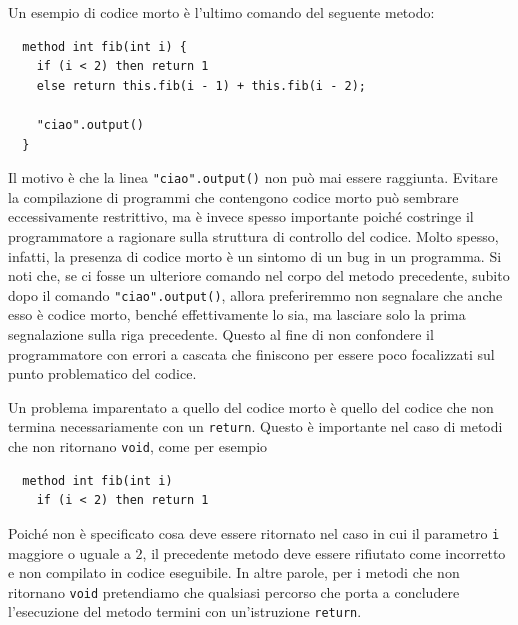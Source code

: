 Un esempio di codice morto \`e l'ultimo comando del seguente metodo:
%
\begin{verbatim}
  method int fib(int i) {
    if (i < 2) then return 1
    else return this.fib(i - 1) + this.fib(i - 2);

    "ciao".output()
  }
\end{verbatim}
%
Il motivo \`e che la linea \verb!"ciao".output()! non pu\`o mai essere
raggiunta. Evitare la compilazione
di programmi che contengono codice morto pu\`o sembrare eccessivamente
restrittivo, ma \`e invece spesso importante poich\'e costringe il
programmatore a ragionare sulla struttura di controllo del codice.
Molto spesso, infatti, la presenza di codice morto \`e un sintomo di
un bug in un programma.
%
%
Si noti che, se ci fosse un ulteriore comando nel corpo del metodo precedente,
subito dopo il comando \verb!"ciao".output()!, allora preferiremmo
non segnalare che anche esso \`e codice morto, bench\'e effettivamente lo sia,
ma lasciare solo la prima segnalazione sulla riga precedente.
Questo al fine di non confondere il programmatore con errori a cascata che
finiscono per essere poco focalizzati sul punto problematico del codice.

Un problema imparentato a quello del codice morto \`e quello del
codice che non termina necessariamente con un \texttt{return}. Questo
\`e importante nel caso di metodi che non ritornano \texttt{void}, come
per esempio
%
\begin{verbatim}
  method int fib(int i)
    if (i < 2) then return 1 
\end{verbatim}
%
Poich\'e non \`e specificato cosa deve essere ritornato nel caso in cui
il parametro \texttt{i} \e maggiore o uguale a $2$, il precedente metodo
deve essere rifiutato come incorretto e non compilato in codice eseguibile.
In altre parole, per i metodi che non ritornano \texttt{void} pretendiamo
che qualsiasi percorso che porta a concludere l'esecuzione del metodo
termini con un'istruzione \texttt{return}.

